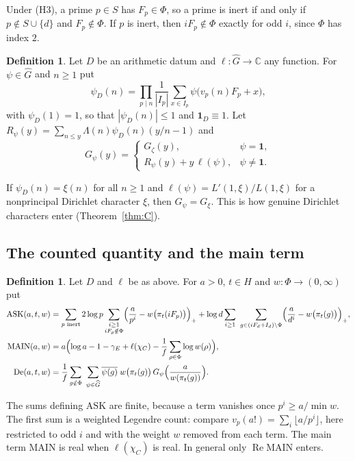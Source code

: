 \documentclass[11pt]{amsart}
\newcommand{\CC}{\mathbb{C}}
\newcommand{\re}{\operatorname{Re}}
\newcommand{\gE}{\gamma_{E}}
\newcommand{\ASK}{\mathrm{ASK}}
\newcommand{\MAIN}{\mathrm{MAIN}}
\newcommand{\De}{\mathrm{De}}
\newcommand{\Gh}{\widehat{G}}
\newcommand{\pa}{\pi}
\theoremstyle{plain}
\theoremstyle{definition}
\newtheorem{definition}[theorem]{Definition}
\numberwithin{equation}{section}
\begin{document}
Under (H3), a prime $p\in S$ has $F_p\in\Phi$, so a prime is inert if and only if
$p\notin S\cup\{d\}$ and $F_p\notin\Phi$. If $p$ is inert, then $iF_p\notin\Phi$ exactly for odd
$i$, since $\Phi$ has index $2$.

\begin{definition}\label{def:Gpsi}
Let $D$ be an arithmetic datum and $\ell:\Gh\to\CC$ any function. For $\psi\in\Gh$ and $n\ge1$ put
\[
\psi_D(n)=\prod_{p\mid n}\frac{1}{|I_p|}\sum_{x\in I_p}\psi\bigl(v_p(n)F_p+x\bigr),
\]
with $\psi_D(1)=1$, so that $|\psi_D(n)|\le1$ and $\mathbf 1_D\equiv1$. Let
$R_\psi(y)=\sum_{n\le y}\Lambda(n)\psi_D(n)(y/n-1)$ and
\[
G_\psi(y)=
\begin{cases}
G_\zeta(y), & \psi=\mathbf 1,\\
R_\psi(y)+y\,\ell(\psi), & \psi\neq\mathbf 1.
\end{cases}
\]
\end{definition}

If $\psi_D(n)=\xi(n)$ for all $n\ge1$ and $\ell(\psi)=L'(1,\xi)/L(1,\xi)$ for a nonprincipal
Dirichlet character $\xi$, then $G_\psi=G_\xi$. This is how genuine Dirichlet characters enter
(Theorem~\ref{thm:C}).

\subsection{The counted quantity and the main term}

\begin{definition}\label{def:ask}
Let $D$ and $\ell$ be as above. For $a>0$, $t\in H$ and $w:\Phi\to(0,\infty)$ put
\begin{align*}
\ASK(a,t,w)&=\sum_{p\text{ inert}}2\log p\sum_{\substack{i\ge1\\ iF_p\notin\Phi}}\Bigl(\frac{a}{p^i}-w\bigl(\pa_t(iF_p)\bigr)\Bigr)_{+}
+\log d\sum_{i\ge1}\ \sum_{g\in(iF_d+I_d)\setminus\Phi}\Bigl(\frac{a}{d^i}-w\bigl(\pa_t(g)\bigr)\Bigr)_{+},\\
\MAIN(a,w)&=a\Bigl(\log a-1-\gE+\ell(\chi_C)-\frac1f\sum_{\rho\in\Phi}\log w(\rho)\Bigr),\\
\De(a,t,w)&=\frac1f\sum_{g\notin\Phi}\ \sum_{\psi\in\Gh}\overline{\psi(g)}\;w\bigl(\pa_t(g)\bigr)\,G_\psi\Bigl(\frac{a}{w(\pa_t(g))}\Bigr).
\end{align*}
\end{definition}

The sums defining $\ASK$ are finite, because a term vanishes once $p^i\ge a/\min w$. The first sum is
a weighted Legendre count: compare $v_p(a!)=\sum_i\lfloor a/p^i\rfloor$, here restricted to odd
$i$ and with the weight $w$ removed from each term. The main term $\MAIN$ is real when $\ell(\chi_C)$
is real. In general only $\re\MAIN$ enters.
\end{document}
